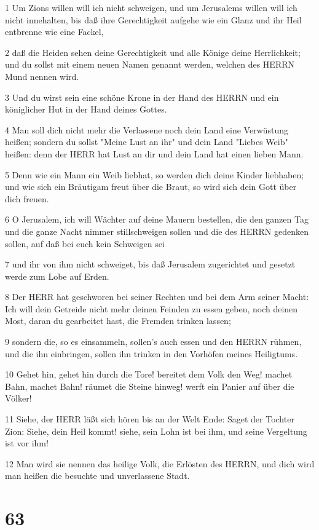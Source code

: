 \par 1 Um Zions willen will ich nicht schweigen, und um Jerusalems willen will ich nicht innehalten, bis daß ihre Gerechtigkeit aufgehe wie ein Glanz und ihr Heil entbrenne wie eine Fackel,
\par 2 daß die Heiden sehen deine Gerechtigkeit und alle Könige deine Herrlichkeit; und du sollst mit einem neuen Namen genannt werden, welchen des HERRN Mund nennen wird.
\par 3 Und du wirst sein eine schöne Krone in der Hand des HERRN und ein königlicher Hut in der Hand deines Gottes.
\par 4 Man soll dich nicht mehr die Verlassene noch dein Land eine Verwüstung heißen; sondern du sollst "Meine Lust an ihr" und dein Land "Liebes Weib" heißen: denn der HERR hat Lust an dir und dein Land hat einen lieben Mann.
\par 5 Denn wie ein Mann ein Weib liebhat, so werden dich deine Kinder liebhaben; und wie sich ein Bräutigam freut über die Braut, so wird sich dein Gott über dich freuen.
\par 6 O Jerusalem, ich will Wächter auf deine Mauern bestellen, die den ganzen Tag und die ganze Nacht nimmer stillschweigen sollen und die des HERRN gedenken sollen, auf daß bei euch kein Schweigen sei
\par 7 und ihr von ihm nicht schweiget, bis daß Jerusalem zugerichtet und gesetzt werde zum Lobe auf Erden.
\par 8 Der HERR hat geschworen bei seiner Rechten und bei dem Arm seiner Macht: Ich will dein Getreide nicht mehr deinen Feinden zu essen geben, noch deinen Most, daran du gearbeitet hast, die Fremden trinken lassen;
\par 9 sondern die, so es einsammeln, sollen's auch essen und den HERRN rühmen, und die ihn einbringen, sollen ihn trinken in den Vorhöfen meines Heiligtums.
\par 10 Gehet hin, gehet hin durch die Tore! bereitet dem Volk den Weg! machet Bahn, machet Bahn! räumet die Steine hinweg! werft ein Panier auf über die Völker!
\par 11 Siehe, der HERR läßt sich hören bis an der Welt Ende: Saget der Tochter Zion: Siehe, dein Heil kommt! siehe, sein Lohn ist bei ihm, und seine Vergeltung ist vor ihm!
\par 12 Man wird sie nennen das heilige Volk, die Erlösten des HERRN, und dich wird man heißen die besuchte und unverlassene Stadt.

\chapter{63}

